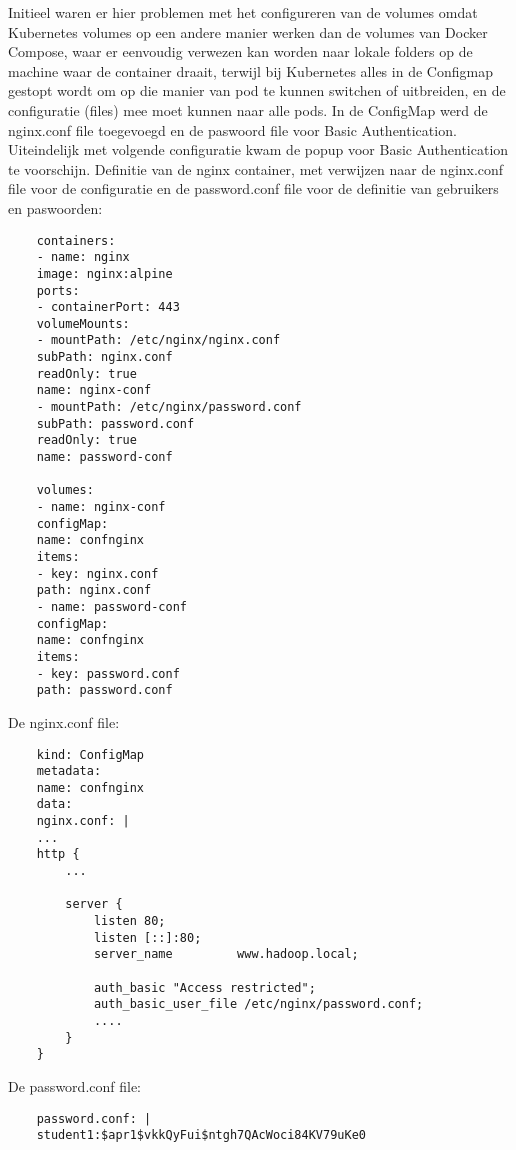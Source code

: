 Initieel waren er hier problemen met het configureren van de volumes omdat Kubernetes volumes op een andere manier werken dan de volumes van Docker Compose, waar er eenvoudig verwezen kan worden naar lokale folders op de machine waar de container draait, terwijl bij Kubernetes alles in de Configmap gestopt wordt om op die manier van pod te kunnen switchen of uitbreiden, en de configuratie (files) mee moet kunnen naar alle pods.
\newline
\newline
In de ConfigMap werd de nginx.conf file toegevoegd en de paswoord file voor Basic Authentication.
Uiteindelijk met volgende configuratie kwam de popup voor Basic Authentication te voorschijn.
\newpage
Definitie van de nginx container, met verwijzen naar de nginx.conf file voor de configuratie en de password.conf file voor de definitie van gebruikers en paswoorden:
\newline
\begin{lstlisting}
    containers:
    - name: nginx
    image: nginx:alpine
    ports:
    - containerPort: 443
    volumeMounts:
    - mountPath: /etc/nginx/nginx.conf
    subPath: nginx.conf
    readOnly: true
    name: nginx-conf
    - mountPath: /etc/nginx/password.conf
    subPath: password.conf
    readOnly: true
    name: password-conf
    
    volumes:
    - name: nginx-conf
    configMap:
    name: confnginx
    items:
    - key: nginx.conf
    path: nginx.conf
    - name: password-conf
    configMap:
    name: confnginx
    items:
    - key: password.conf
    path: password.conf
\end{lstlisting}

De nginx.conf file:
\begin{lstlisting}
    kind: ConfigMap
    metadata:
    name: confnginx
    data:
    nginx.conf: |
    ...
    http {
        ...
        
        server {
            listen 80;
            listen [::]:80;
            server_name         www.hadoop.local;
            
            auth_basic "Access restricted";
            auth_basic_user_file /etc/nginx/password.conf;
            ....
        }
    }
\end{lstlisting}

De password.conf file:
\begin{lstlisting}
    password.conf: |
    student1:$apr1$vkkQyFui$ntgh7QAcWoci84KV79uKe0
    
\end{lstlisting}


